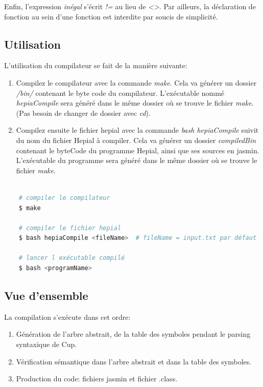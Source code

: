 \documentclass[11pt,a4paper]{article}
\begin{document}
     \par Enfin, l'expression \textit{inégal} s'écrit \textit{!=} au lieu de \textit{<>}. Par ailleurs, la déclaration de fonction au sein d'une fonction est interdite par soucis de simplicité.
     
  \subsection{Utilisation}
  
  \par L'utilisation du compilateur se fait de la manière suivante: 

  \begin{enumerate}
  \item Compilez le compilateur avec la commande \textit{make}. Cela va générer un dossier \textit{/bin/} contenant le byte code du compilateur. L'exécutable nommé \textit{hepiaCompile} sera généré dans le même dossier où se trouve le fichier \textit{make}. (Pas besoin de changer de dossier avec \textit{cd}).  
  \item Compilez ensuite le fichier hepial avec la commande \textit{bash hepiaCompile} suivit du nom du fichier Hepial à compiler. Cela va générer un dossier \textit{compiledBin} contenant le byteCode du programme Hepial, ainsi que ses sources en jasmin. L’exécutable du programme sera généré dans le même dossier où se trouve le fichier \textit{make}.
  \end{enumerate}
  
  \begin{lstlisting}[language=bash,caption={Utilisation du compilateur}]
    
    # compiler le compilateur
    $ make 
    
    # compiler le fichier hepial
    $ bash hepiaCompile <fileName>  # fileName = input.txt par défaut
    
    # lancer l exécutable compilé
    $ bash <programName>
  \end{lstlisting}

\newpage  
  
  \subsection{Vue d'ensemble}
  
  \par La compilation s'exécute dans cet ordre:
  \begin{enumerate}
    \item Génération de l'arbre abstrait, de la table des symboles pendant le parsing syntaxique de Cup. 
    \item Vérification sémantique dans l'arbre abstrait et dans la table des symboles. 
    \item Production du code: fichiers jasmin et fichier .class. 
  \end{enumerate}
  
\end{document}
